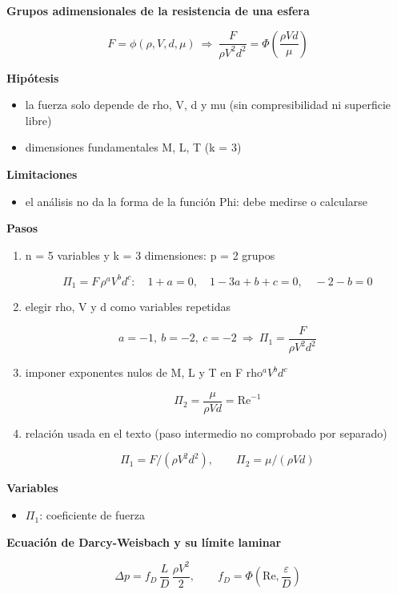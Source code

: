 \documentclass[10pt,openany]{book}
\begin{document}
\begin{tcolorbox}[title={Desarrollos del modelo}, studiumdef, breakable]

\noindent\textbf{Grupos adimensionales de la resistencia de una esfera}

\[
F = \phi(\rho, V, d, \mu)\ \Rightarrow\ \frac{F}{\rho V^{2} d^{2}} = \Phi\!\left(\frac{\rho V d}{\mu}\right)
\]

\noindent\textbf{Hipótesis}
\begin{itemize}
\item la fuerza solo depende de rho, V, d y mu (sin compresibilidad ni superficie libre)
\item dimensiones fundamentales M, L, T (k = 3)
\end{itemize}

\noindent\textbf{Limitaciones}
\begin{itemize}
\item el análisis no da la forma de la función Phi: debe medirse o calcularse
\end{itemize}

\noindent\textbf{Pasos}
\begin{enumerate}
\item
n = 5 variables y k = 3 dimensiones: p = 2 grupos

\[
\Pi_1 = F\,\rho^{a} V^{b} d^{c}:\quad 1 + a = 0,\quad 1 - 3a + b + c = 0,\quad -2 - b = 0
\]
\item
elegir rho, V y d como variables repetidas

\[
a = -1,\ b = -2,\ c = -2\ \Rightarrow\ \Pi_1 = \frac{F}{\rho V^{2} d^{2}}
\]
\item
imponer exponentes nulos de M, L y T en F rho\(^a V^b d^c\)

\[
\Pi_2 = \frac{\mu}{\rho V d} = \mathrm{Re}^{-1}
\]
\item
relación usada en el texto (paso intermedio no comprobado por separado)

\[
\Pi_1 = F/(\rho V^{2} d^{2}),\qquad \Pi_2 = \mu/(\rho V d)
\]
\end{enumerate}

\noindent\textbf{Variables}
\begin{itemize}
\item $\Pi_{1}$: coeficiente de fuerza
\end{itemize}



\noindent\textbf{Ecuación de Darcy-Weisbach y su límite laminar}

\[
\Delta p = f_D\,\frac{L}{D}\,\frac{\rho V^{2}}{2},\qquad f_D = \Phi\!\left(\mathrm{Re}, \frac{\varepsilon}{D}\right)
\]


\end{tcolorbox}
\end{document}
